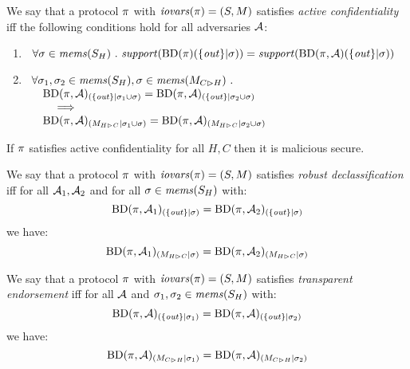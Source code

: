 \begin{definition}
  We say that a protocol $\pi$ with $\mathit{iovars}(\pi) = (S,M)$ satisfies \emph{active confidentiality} iff the following conditions hold
  for all adversaries $\mathcal{A}$:
  \begin{enumerate}
  \item $\ \,\forall \sigma \in \mathit{mems}(S_H) \ .\ \mathit{support}(\mathrm{BD}(\pi)(\{ \mathit{out} \}|\sigma)) =
    \mathit{support}(\mathrm{BD}(\pi,\mathcal{A})(\{ \mathit{out} \}|\sigma))$
  \item $\begin{array}[t]{l}\forall \sigma_1, \sigma_2 \in \mathit{mems}(S_H), \sigma \in \mathit{mems}(M_{C \rhd H})\ . \\
    \quad
    \mathrm{BD}(\pi,\mathcal{A})_{({\{ \mathit{out} \}}|{\sigma_1 \cup \sigma})} =
    \mathrm{BD}(\pi,\mathcal{A})_{({\{ \mathit{out} \}}|{\sigma_2 \cup \sigma})} \\
    \qquad \implies\\
    \quad
    \mathrm{BD}(\pi,\mathcal{A})_{({M_{H \rhd C}}|{\sigma_1 \cup \sigma})} =
    \mathrm{BD}(\pi,\mathcal{A})_{({M_{H \rhd C}}|{\sigma_2 \cup \sigma})}\end{array}$
  \end{enumerate}
\end{definition}

\begin{theorem}
  If $\pi$ satisfies active confidentiality for all $H,C$ then it is malicious secure.
\end{theorem}

\begin{definition}
  We say that a protocol $\pi$ with $\mathit{iovars}(\pi) = (S,M)$ satisfies \emph{robust declassification} iff for all $\mathcal{A}_1,\mathcal{A}_2$ and
  for all $\sigma \in \mathit{mems}(S_H)$ with: %
  $$
  \mathrm{BD}(\pi,\mathcal{A}_1)_{({\{ \mathit{out} \}}|{\sigma})} =
  \mathrm{BD}(\pi,\mathcal{A}_2)_{({\{ \mathit{out} \}}|{\sigma})}
  $$
  we have:
  $$
  \mathrm{BD}(\pi,\mathcal{A}_1)_{({M_{H \rhd C}}|{\sigma})} =
  \mathrm{BD}(\pi,\mathcal{A}_2)_{({M_{H \rhd C}}|{\sigma})}
  $$
\end{definition}

\begin{definition}
  We say that a protocol $\pi$ with $\mathit{iovars}(\pi) = (S,M)$ satisfies \emph{transparent endorsement} iff for all $\mathcal{A}$ and $\sigma_1, \sigma_2 \in \mathit{mems}(S_H)$ with:
  $$
    \mathrm{BD}(\pi,\mathcal{A})_{({\{ \mathit{out} \}}|{\sigma_1})} =
    \mathrm{BD}(\pi,\mathcal{A})_{({\{ \mathit{out} \}}|{\sigma_2})}
  $$
  we have:  
  $$
  \mathrm{BD}(\pi,\mathcal{A})_{({M_{C \rhd H}}|{\sigma_1})} =
    \mathrm{BD}(\pi,\mathcal{A})_{({M_{C \rhd H}}|{\sigma_2})}
  $$
\end{definition}


